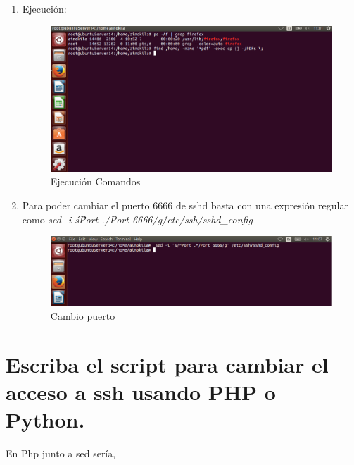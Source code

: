 \begin{enumerate}[label=(\alph*)]
	\item Ejecución:
		\begin{figure}[H]
		\centering
		\includegraphics[scale=0.35]{pics/a.png}  
		\caption{Ejecución Comandos} \label{fig:ejecucion}
		\end{figure}
	
	\item Para poder cambiar el puerto 6666 de sshd basta con una expresión regular como  \textit{sed -i \'s\/\^Port .\*/Port 6666/g\' /etc/ssh/sshd\_config}
	
	\begin{figure}[H]
		\centering
		\includegraphics[scale=0.35]{pics/sed.png}  
		\caption{Cambio puerto} \label{fig:cambio_puerto}
	\end{figure}
	
	
	
\end{enumerate}
\section[Cuestión 16]{Escriba el script para cambiar el acceso a ssh usando PHP o Python.}

En Php junto a sed sería,

